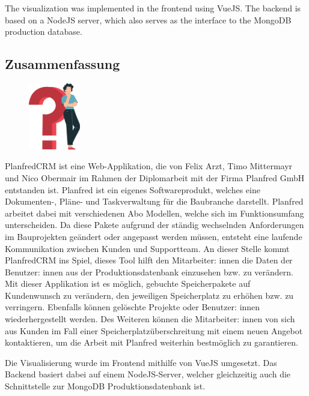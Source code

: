 The visualization was implemented in the frontend using VueJS. The backend is based on a NodeJS server, which also serves as the interface to the MongoDB production database.
\newpage
\begin{spacing}{1}
    \chapter*{Zusammenfassung}
\end{spacing}
\begin{figure}
    \begin{center}
      \includegraphics[width=0.2\textwidth]{pics/question_mark.png}
    \end{center}
\end{figure}
PlanfredCRM ist eine Web-Applikation, die von Felix Arzt, Timo Mittermayr und Nico Obermair im Rahmen der Diplomarbeit mit der Firma Planfred GmbH entstanden ist. Planfred ist ein eigenes Softwareprodukt, welches eine Dokumenten-, Pläne- und Taskverwaltung für die Baubranche darstellt. Planfred arbeitet dabei mit verschiedenen Abo Modellen, welche sich im Funktionsumfang unterscheiden. Da diese Pakete aufgrund der ständig wechselnden Anforderungen im Bauprojekten geändert oder angepasst werden müssen, entsteht eine laufende Kommunikation zwischen Kunden und Supportteam. An dieser Stelle kommt PlanfredCRM ins Spiel, dieses Tool hilft den Mitarbeiter: innen die Daten der Benutzer: innen aus der Produktionsdatenbank einzusehen bzw. zu verändern. Mit dieser Applikation ist es möglich, gebuchte Speicherpakete auf Kundenwunsch zu verändern, den jeweiligen Speicherplatz zu erhöhen bzw. zu verringern. Ebenfalls können gelöschte Projekte oder Benutzer: innen wiederhergestellt werden. Des Weiteren können die Mitarbeiter: innen von sich aus Kunden im Fall einer Speicherplatzüberschreitung mit einem neuen Angebot kontaktieren, um die Arbeit mit Planfred weiterhin bestmöglich zu garantieren.

Die Visualisierung wurde im Frontend mithilfe von VueJS umgesetzt. Das Backend basiert dabei auf einem NodeJS-Server, welcher gleichzeitig auch die Schnittstelle zur MongoDB Produktionsdatenbank ist.

